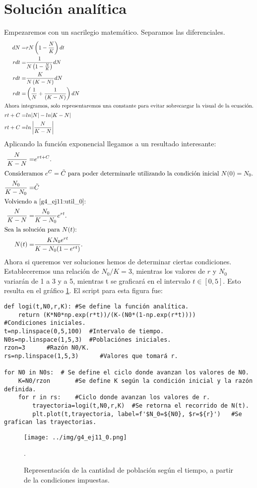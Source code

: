 \documentclass[../portafolio.tex]{subfiles}
\begin{document}
\section{Solución analítica}
Empezaremos con un sacrilegio matemático. Separamos las diferenciales.
\begin{align}
dN=&rN\left(1 -\frac{N}{K}\right)dt\\
rdt=&\frac{1}{N\left(1 -\frac{N}{K}\right)}dN\\
rdt=&\frac{K}{N\left(K -N\right)}dN\\
rdt=&\left( \frac{1}{N}+ \frac{1}{\left(K -N\right)}\right)dN \\ \intertext{Ahora integramos, solo representaremos una constante para evitar sobrecargar la visual de la ecuación.}
r t +C =& ln|N| - ln|K-N|	\\
rt+C= & ln\left|\frac{N}{K-N} \right|
\end{align}
Aplicando la función exponencial llegamos a un resultado interesante:
\begin{align}
\frac{N}{K-N} =& e^{rt+C}.\\ \label{g4_ej11:util_0} \intertext{Consideramos $e^C = \tilde{C}$ para poder determinarle utilizando la condición inicial $N(0)=N_0$.}
\frac{N_0}{K-N_0} =& \tilde{C} \\ \intertext{Volviendo a \eqref{g4_ej11:util_0}:}
\frac{N}{K-N} =& \frac{N_0}{K-N_0} e^{rt}.\\ \intertext{Sea la solución para $N(t)$:}
N(t)=&\frac{KN_0e^{rt}}{K-N_0(1-e^{rt})}.
\end{align}
Ahora si queremos ver soluciones hemos de determinar ciertas condiciones. Estableceremos una relación de $N_0/K=3$, mientras los valores de $r$ y $N_0$ variarán de 1 a 3 y a 5, mientras t se graficará en el intervalo $t \in [0,5]$. Esto resulta en el gráfico \ref{g4_ej11:11_graf}. El script para esta figura fue:
\begin{verbatim}
def logi(t,N0,r,K): #Se define la función analítica.
    return (K*N0*np.exp(r*t))/(K-(N0*(1-np.exp(r*t))))
#Condiciones iniciales.
t=np.linspace(0,5,100)  #Intervalo de tiempo.
N0s=np.linspace(1,5,3)  #Poblaciónes iniciales.
rzon=3      #Razón N0/K.
rs=np.linspace(1,5,3)      #Valores que tomará r.

for N0 in N0s:  # Se define el ciclo donde avanzan los valores de N0.
    K=N0/rzon       #Se define K según la condición inicial y la razón definida.
    for r in rs:    #Ciclo donde avanzan los valores de r.
        trayectoria=logi(t,N0,r,K)  #Se retorna el recorrido de N(t).
        plt.plot(t,trayectoria, label=f'$N_0=${N0}, $r=${r}')   #Se grafican las trayectorias.
\end{verbatim}
\begin{figure}
\centering
\texttt{[image: ../img/g4\_ej11\_0.png]} 
\caption{Representación de la cantidad de población según el tiempo, a partir de la condiciones impuestas.}\label{g4_ej11:11_graf}.
\end{figure}
\end{document}
